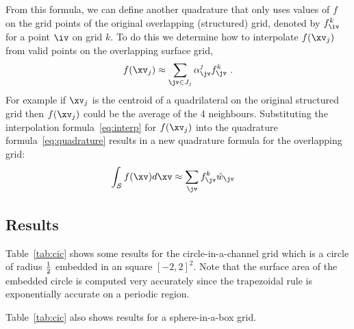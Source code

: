 From this formula, we can define another quadrature that only uses values of $f$ on the
grid points of the original overlapping (structured) grid, denoted by $f_\iv^k$ for a point $\iv$ 
on grid $k$. 
To do this we determine how to interpolate $f(\xv_j)$ from valid points on the overlapping
surface grid, 
\begin{align}
  f(\xv_j) \approx \sum_{\jv\in J_j} \alpha_{\jv}^j f_{\jv}^k  ~. \label{eq:interp}
\end{align}
For example if $\xv_j$ is the centroid of a quadrilateral on the original structured grid then
$f(\xv_j)$ could be the average of the 4 neighbours. 
Substituting the interpolation formula~\eqref{eq:interp}
for $f(\xv_j)$ into the quadrature formula~\eqref{eq:quadrature}
results in a new quadrature formula for the overlapping grid:
\begin{align*}
  \int_\Sc f(\xv) d\xv  &\approx  \sum_{\jv} f_{\jv}^k \hat{w}_{\jv}
\end{align*}




\clearpage
\subsection{Results}

Table~\ref{tab:cic} shows some results for the circle-in-a-channel grid which
is a circle of radius ${1\over2}$ embedded in an square $[-2,2]^2$.
Note that the surface area of the embedded circle is computed very accurately since 
the trapezoidal rule is exponentially accurate on a periodic region.

Table~\ref{tab:cic} also shows results for a sphere-in-a-box grid.


% 
% 
% 
% 
% 



